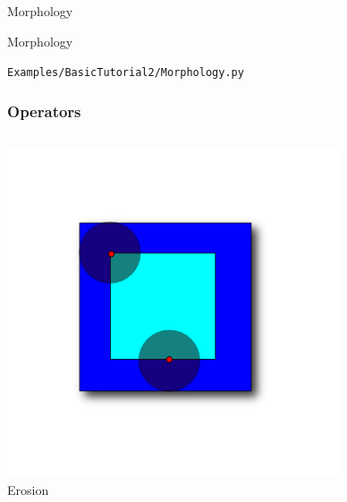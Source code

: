 \begin{frame}{Morphology}
\fontsize{36pt}{36pt}\selectfont
\center
\begin{center}
Morphology
\end{center}
\vspace{20pt}
\begin{center}
\fontsize{11pt}{11pt}\selectfont
\texttt{Examples/BasicTutorial2/Morphology.py}
\end{center}
\end{frame}

\begin{frame}[fragile]
\frametitle{Operators}

\begin{columns}[c]

\begin{center}
\includegraphics[width=1\textwidth]{Images/Erosion_shadow} \\
Erosion
\end{center}


\end{columns}
\end{frame}
